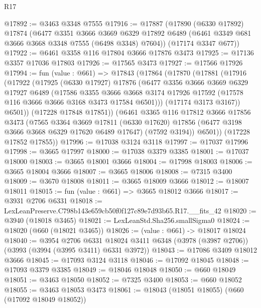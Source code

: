 \begin{lexlean}{R17}
\begin{coremodule}
@17892 := @3463 @3348 @7555
@17916 := @17887
    (@17890
      (@6330 @17892)
      @17874
      (@6477
        @3351
        @3666
        @3669
        @6329
        @17892
        @6489
        (@6461 @3349 @681 @3666 @3668 @3348 @7555 (@6498 @3348) @7604))
      (@17174 @3347 @677))
@17922 := @6461 @3358 @116 @17804 @3666 @17876 @3473
@17925 := @17136 @3357 @17036 @17803
@17926 := @17565 @3473
@17927 := @17566 @17926
@17994 := fun (value : @661) =>
  @17843
    (@17864
      (@17870
        (@17881
          (@17916
            (@17922
              (@17925
                (@6330 @17927)
                @17876
                (@6477
                  @3356
                  @3666
                  @3669
                  @6329
                  @17927
                  @6489
                  (@17586
                    @3355
                    @3666
                    @3668
                    @3174
                    @17926
                    @17592
                    (@17578 @116 @3666 @3666 @3168 @3473 @17584 @6501)))
                (@17174 @3173 @3167))
              @6501))
          (@17228 @17848 @17851))
        (@6461
          @3365
          @116
          @17812
          @3666
          @17856
          @3473
          (@7565
            @3364
            @3669
            @17811
            (@6330 @17620)
            @17856
            (@6477 @3198 @3666 @3668 @6329 @17620 @6489 @17647)
            (@7592 @3194))
          @6501))
      (@17228 @17852 @17855))
@17996 := @17038 @3124 @3118
@17997 := @17037 @17996
@17998 := @3665 @17997
@18000 := @17038 @3379 @3385
@18001 := @17037 @18000
@18003 := @3665 @18001 @3666
@18004 := @17998 @18003
@18006 := @3665 @18004 @3666
@18007 := @3665 @18006
@18008 := @7315 @3400
@18009 := @3670 @18008
@18011 := @3665 @18009 @3666
@18012 := @18007 @18011
@18015 := fun (value : @661) => @3665 @18012 @3666
@18017 := @3931 @2706 @6331
@18018 := LexLeanPreserve.C798b143e659cb50f0f127c89e7d93b65.R17.__fits_42
@18020 := @3940 (@18018 @3465)
@18021 := LexLeanStd.Sha256.smallSigma0
@18024 := @18020 (@660 (@18021 @3465))
@18026 := (value : @661) -> @18017 @18024
@18040 := @3954
    @2706
    @6331
    @18024
    @3411
    @6348
    (@3978 (@3987 @2706))
    (@3993 (@3994 (@3995 @3411) @6331 @3972))
@18043 := @17086 @3409 @18012 @3666
@18045 := @17093 @3124 @3118
@18046 := @17092 @18045
@18048 := @17093 @3379 @3385
@18049 := @18046 @18048
@18050 := @660 @18049
@18051 := @3463 @18050
@18052 := @7325 @3400
@18053 := @660 @18052
@18055 := @3463 @18053 @3473
@18061 := @18043 (@18051 @18055) (@660 (@17092 @18049 @18052))

\end{coremodule}
\end{lexlean}
